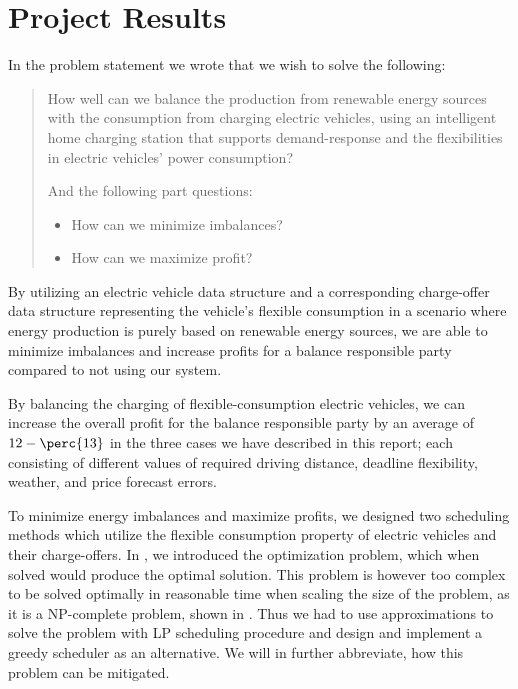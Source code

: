 \section{Project Results}\label{sec:results}
In the problem statement we wrote that we wish to solve the following:
\begin{quote}
  How well can we balance the production from renewable energy sources with the consumption from charging electric vehicles, using an intelligent home charging station that supports demand-response and the flexibilities in electric vehicles' power consumption?

  And the following part questions:
  \begin{itemize}
    \item How can we minimize imbalances?
    \item How can we maximize profit?
  \end{itemize}
\end{quote}


By utilizing an electric vehicle data structure and a corresponding charge-offer data structure representing the vehicle's flexible consumption in a scenario where energy production is purely based on renewable energy sources, we are able to minimize imbalances and increase profits for a balance responsible party compared to not using our system.

By balancing the charging of flexible-consumption electric vehicles, we can increase the overall profit for the balance responsible party by an average of $12-\perc{13}$ in the three cases we have described in this report; each consisting of different values of required driving distance, deadline flexibility, weather, and price forecast errors.

To minimize energy imbalances and maximize profits, we designed two scheduling methods which utilize the flexible consumption property of electric vehicles and their charge-offers. In , we introduced the optimization problem, which when solved would produce the optimal solution. This problem is however too complex to be solved optimally in reasonable time when scaling the size of the problem, as it is a NP-complete problem, shown in . Thus we had to use approximations to solve the problem with LP scheduling procedure and design and implement a greedy scheduler as an alternative. We will in  further abbreviate, how this problem can be mitigated.%

